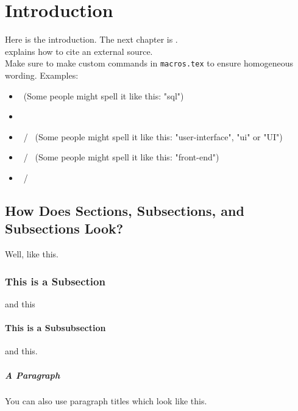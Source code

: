 \chapter{Introduction} \label{chap:introduction}

Here is the introduction. The next chapter is .\\ %
 explains how to cite an external source.\\

Make sure to make custom commands in \texttt{macros.tex} to ensure homogeneous wording. Examples:
\begin{itemize}
    \item \sql\ (Some people might spell it like this: "sql")
    \item \sqldb
    \item \Ui\ / \ui\ (Some people might spell it like this: "user-interface", "ui" or "UI")
    \item \Frontend\ / \frontend\ (Some people might spell it like this: "front-end")
    \item \Backend\ / \backend
\end{itemize}

\section{How Does Sections, Subsections, and Subsections Look?}
Well, like this.
\subsection{This is a Subsection}
and this
\subsubsection{This is a Subsubsection}
and this.

\paragraph{A Paragraph}
You can also use paragraph titles which look like this.

\lipsum